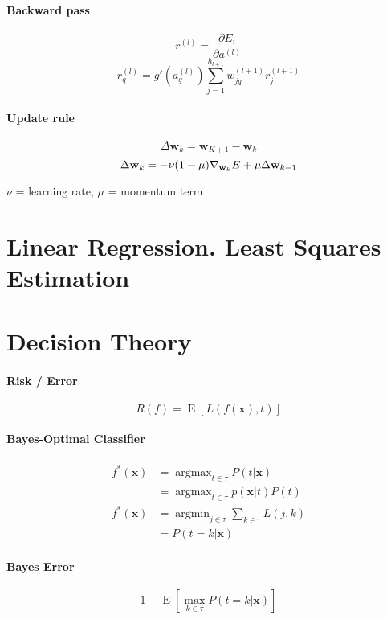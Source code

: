 \documentclass[7pt]{scrartcl}
\DeclareMathOperator*{\argmax}{argmax}
\DeclareMathOperator*{\argmin}{argmin}
\DeclareMathOperator{\E}{E}
\begin{document}
\begin{multicols}{4}
\paragraph{Backward pass}
\[r^{(l)}=\frac{\partial E_i}{\partial a^{(l)}}\]
\[r_q^{(l)}=g'(a_q^{(l)})\sum_{j=1}^{h_{l+1}}w_{jq}^{(l+1)}r_j^{(l+1)}\]

\paragraph{Update rule}

\[\Delta \mathbf w_k = \mathbf w_{K+1}-\mathbf w_k\]
\[\Delta \mathbf w_k = -\nu(1-\mu)\nabla_{\textbf w_k}E+\mu \Delta \mathbf w_{k-1}\]

$\nu$ = learning rate, $\mu$ = momentum term

\section{Linear Regression. Least Squares Estimation}

\section{Decision Theory}
\paragraph{Risk / Error}
\[ R(f) = \E \left [ L(f(\mathbf x), t) \right ] \]

\paragraph{Bayes-Optimal Classifier}
\begin{align*}
f^*(\mathbf x) &= \argmax_{t \in \tau} P(t|\mathbf x) \\ 
&= \argmax_{t \in \tau} p(\mathbf x|t) P(t) \\
f^*(\mathbf x) &= \argmin_{j \in \tau} \sum_{k \in \tau} L(j,k) \\ 
 &= P(t = k | \mathbf x) \end{align*}

\paragraph{Bayes Error}
\begin{equation*} 1 - \E \left [ \max_{k\in\tau} P(t = k | \mathbf x) \right ] \end{equation*}


\end{multicols}
\end{document}
